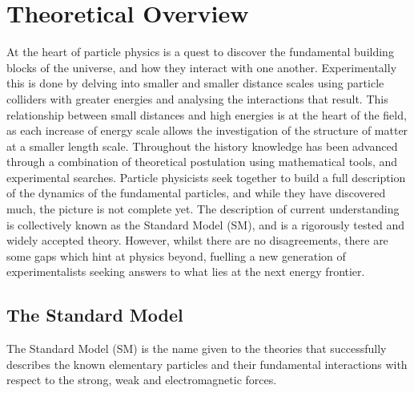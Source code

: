 \chapter{Theoretical Overview}
\label{ch:theory}
At the heart of particle physics is a quest to discover the fundamental building blocks of the universe, and how they interact with one another. Experimentally this is done by delving into smaller and smaller distance scales using particle colliders with greater energies and analysing the interactions that result. This relationship between small distances and high energies is at the heart of the field, as each increase of energy scale allows the investigation of the structure of matter at a smaller length scale. Throughout the history knowledge has been advanced through a combination of theoretical postulation using mathematical tools, and experimental searches. Particle physicists seek together to build a full description of the dynamics of the fundamental particles, and while they have discovered much, the picture is not complete yet. The description of current understanding is collectively known as the Standard Model (SM), and is a rigorously tested and widely accepted theory. However, whilst there are no disagreements, there are some gaps which hint at physics beyond, fuelling a new generation of experimentalists seeking answers to what lies at the next energy frontier.

\section{The Standard Model}

The Standard Model (SM) is the name given to the theories that successfully describes the known elementary particles and their fundamental interactions with respect to the strong, weak and electromagnetic forces. 


